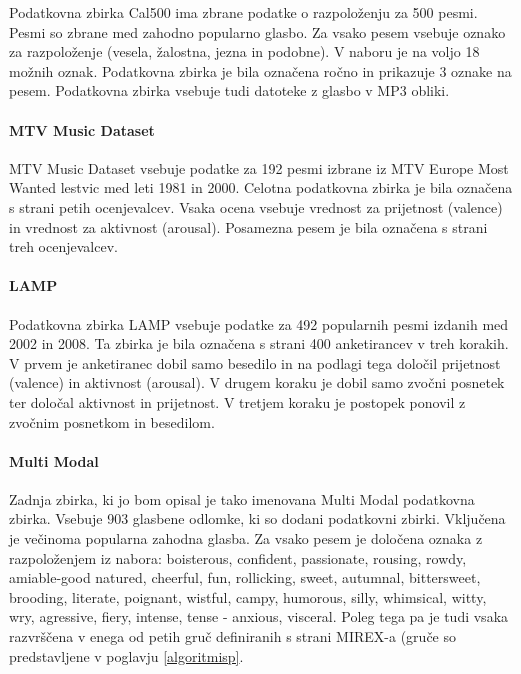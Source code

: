 \documentclass[a4paper, 12pt]{book}
\begin{document}
{Podatkovna zbirka Cal500 \cite{turnbull2008semantic} ima zbrane podatke o razpoloženju za 500 pesmi. Pesmi so zbrane med zahodno popularno glasbo. Za vsako pesem vsebuje oznako za razpoloženje (vesela, žalostna, jezna in podobne). V naboru je na voljo 18 možnih oznak. Podatkovna zbirka je bila označena ročno in prikazuje 3 oznake na pesem. Podatkovna zbirka vsebuje tudi datoteke z glasbo v MP3 obliki.

\paragraph{MTV Music Dataset}

MTV Music Dataset \cite{schuller2010mister} vsebuje podatke za 192 pesmi izbrane iz MTV Europe Most Wanted lestvic med leti 1981 in 2000. Celotna podatkovna zbirka je bila označena s strani petih ocenjevalcev. Vsaka ocena vsebuje vrednost za prijetnost (valence) in vrednost za aktivnost (arousal). Posamezna pesem je bila označena s strani treh ocenjevalcev.

\paragraph{LAMP}

Podatkovna zbirka LAMP \cite{chu2010lamp} vsebuje podatke za 492 popularnih pesmi izdanih med 2002 in 2008. Ta zbirka je bila označena s strani 400 anketirancev v treh korakih. V prvem je anketiranec dobil samo besedilo in  na podlagi tega določil prijetnost (valence) in aktivnost (arousal). V drugem koraku je dobil samo zvočni posnetek ter določal aktivnost in prijetnost. V tretjem koraku je postopek ponovil z zvočnim posnetkom in besedilom.

\paragraph{Multi Modal}

Zadnja zbirka, ki jo bom opisal je tako imenovana Multi Modal \cite{panda2013multi} podatkovna zbirka. Vsebuje 903 glasbene odlomke, ki so dodani podatkovni zbirki. Vključena je večinoma popularna zahodna glasba. Za vsako pesem je določena oznaka z razpoloženjem iz nabora: boisterous, confident, passionate, rousing, rowdy, amiable-good natured, cheerful, fun, rollicking, sweet, autumnal, bittersweet, brooding, literate, poignant, wistful, campy, humorous, silly, whimsical, witty, wry, agressive, fiery, intense, tense - anxious, visceral. Poleg tega pa je tudi vsaka razvrščena v enega od petih gruč definiranih s strani MIREX-a (gruče so predstavljene v poglavju \ref{algoritmisp}. 

}
\end{document}
